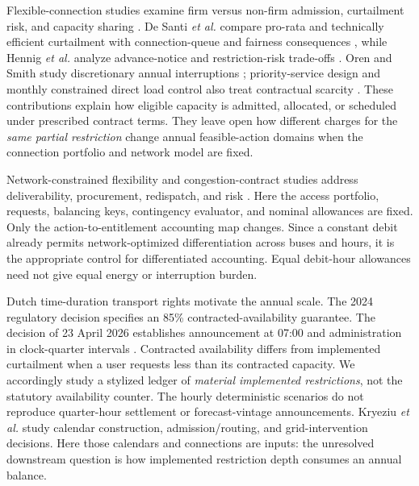 \documentclass[10pt,journal]{IEEEtran}
\begin{document}
Flexible-connection studies examine firm versus non-firm admission, curtailment risk, and capacity sharing \cite{AnayaPollitt2015,DzamarijaKeane2013,Sedzro2021,Bjarghov2024}. De Santi \emph{et al.} compare pro-rata and technically efficient curtailment with connection-queue and fairness consequences \cite{DeSanti2025}, while Hennig \emph{et al.} analyze advance-notice and restriction-risk trade-offs \cite{Hennig2024RiskRestriction}. Oren and Smith study discretionary annual interruptions \cite{OrenSmith1992}; priority-service design and monthly constrained direct load control also treat contractual scarcity \cite{ChaoWilson1990,Fattahi2024}. These contributions explain how eligible capacity is admitted, allocated, or scheduled under prescribed contract terms. They leave open how different charges for the \emph{same partial restriction} change annual feasible-action domains when the connection portfolio and network model are fixed.

Network-constrained flexibility and congestion-contract studies address deliverability, procurement, redispatch, and risk \cite{VanDerHolst2024Activation,VanDerHolst2025Synergies,VanDerHolst2026RiskAware}. Here the access portfolio, requests, balancing keys, contingency evaluator, and nominal allowances are fixed. Only the action-to-entitlement accounting map changes. Since a constant debit already permits network-optimized differentiation across buses and hours, it is the appropriate control for differentiated accounting. Equal debit-hour allowances need not give equal energy or interruption burden.

Dutch time-duration transport rights motivate the annual scale. The 2024 regulatory decision specifies an 85\% contracted-availability guarantee. The decision of 23 April 2026 establishes announcement at 07:00 and administration in clock-quarter intervals \cite{ACM2024ATR,ACM2026TDTR}. Contracted availability differs from implemented curtailment when a user requests less than its contracted capacity. We accordingly study a stylized ledger of \emph{material implemented restrictions}, not the statutory availability counter. The hourly deterministic scenarios do not reproduce quarter-hour settlement or forecast-vintage announcements. Kryeziu \emph{et al.} \cite{Kryeziu2026AccessRights} study calendar construction, admission/routing, and grid-intervention decisions. Here those calendars and connections are inputs: the unresolved downstream question is how implemented restriction depth consumes an annual balance.
\end{document}
